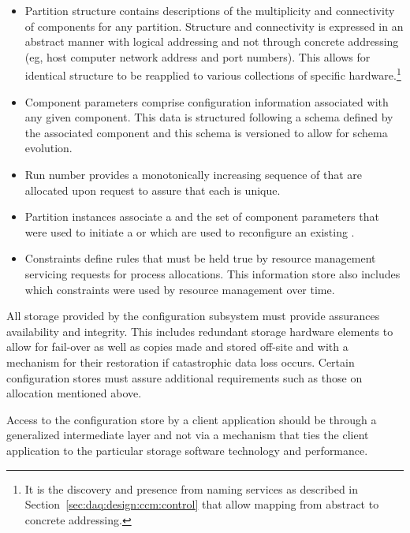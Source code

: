\begin{itemize}

\item Partition structure contains descriptions of the multiplicity and connectivity of  components for any partition. 
  Structure and connectivity is expressed in an abstract manner with logical addressing and not through concrete addressing (eg, host computer network address and port numbers). 
  This allows for identical structure to be reapplied to various collections of specific hardware.\footnote{It is the discovery and presence from naming services as described in Section~\ref{sec:daq:design:ccm:control} that allow mapping from abstract to concrete addressing.}

\item Component parameters comprise configuration information associated with any given  component.  This data is structured following a schema defined by the associated component and this schema is versioned to allow for schema evolution.

\item Run number provides a monotonically increasing sequence of  that are allocated upon request to assure that each is unique.

\item Partition instances associate a  and the set of component parameters that were used to initiate a  or which are used to reconfigure an existing .  

\item Constraints define rules that must be held true by resource management servicing requests for process allocations.  This information store also includes which constraints were used by resource management over time.
\end{itemize}


All storage provided by the configuration subsystem must provide assurances availability and integrity. 
This includes redundant storage hardware elements to allow for fail-over as well as copies made and stored off-site and with a mechanism for their restoration if catastrophic data loss occurs.
Certain configuration stores must assure additional requirements such as those on  allocation mentioned above.

Access to the configuration store by a client application should be through a generalized intermediate layer and not via a mechanism that ties the client application to the particular storage software technology and performance.

